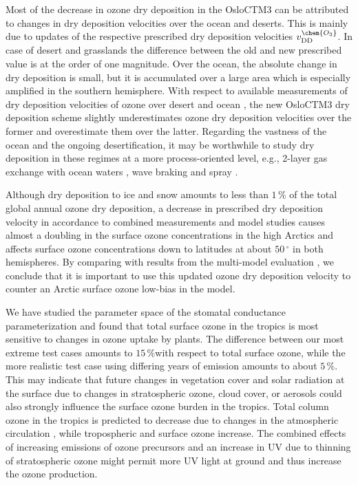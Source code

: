\documentclass[gmd, manuscript]{copernicus}
\begin{document}
Most of the decrease in ozone dry deposition in the OsloCTM3 can be attributed to changes in dry deposition velocities over the ocean and deserts. This is mainly due to updates of the respective prescribed dry deposition velocities $v_\text{DD}^\chem{O_3}$. In case of desert and grasslands the difference between the old and new prescribed value is at the order of one magnitude. Over the ocean, the absolute change in dry deposition is small, but it is accumulated over a large area which is especially amplified in the southern hemisphere. With respect to available measurements of dry deposition velocities of ozone over desert \citep{AE:Gusten1995} and ocean \citep{JGR:Helmig2012}, the new OsloCTM3 dry deposition scheme slightly underestimates ozone dry deposition velocities over the former and overestimate them over the latter. Regarding the vastness of the ocean and the ongoing desertification, it may be worthwhile to study dry deposition in these regimes at a more process-oriented level, e.g., 2-layer gas exchange with ocean waters \citep{ACP:Luhar2017}, wave braking and spray \citep{ACP:Pozzer2006}.

Although dry deposition to ice and snow amounts to less than $1\,\unit{\%}$ of the total global annual ozone dry deposition, a decrease in prescribed dry deposition velocity in accordance to combined measurements and model studies \citep{ACP:Helmig2007} causes almost a doubling in the surface ozone concentrations in the high Arctics and affects surface ozone concentrations down to latitudes at about $50\,\unit{^\circ}$ in both hemispheres. By comparing with results from the multi-model evaluation \citep{ACP:Hardacre2015}, we conclude that it is important to use this updated ozone dry deposition velocity to counter an Arctic surface ozone low-bias in the model.

We have studied the parameter space of the stomatal conductance parameterization and found that total surface ozone in the tropics is most sensitive to changes in ozone uptake by plants. The difference between our most extreme test cases amounts to $15\,\unit{\%}$with respect to total surface ozone, while the more realistic test case using differing years of emission amounts to about $5\,\unit{\%}$. This may indicate that future changes in vegetation cover and solar radiation at the surface due to changes in stratospheric ozone, cloud cover, or aerosols could also strongly influence the surface ozone burden in the tropics. Total column ozone in the tropics is predicted to decrease due to changes in the atmospheric circulation \citep[e.g.,][]{WMO2014}, while tropospheric and surface ozone increase. The combined effects of increasing emissions of ozone precursors and an increase in UV due to thinning of stratospheric ozone might permit more UV light at ground and thus increase the ozone production.
\end{document}

